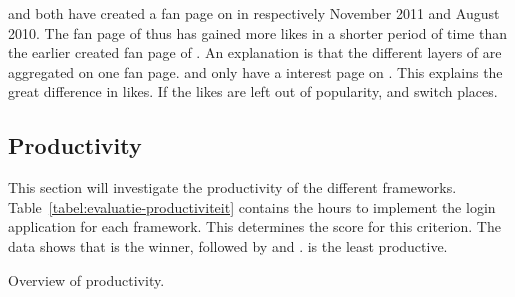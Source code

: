 \documentclass[a4paper]{artikel3}
\begin{document}
\kendoa{} and \jqma{} both have created a fan page on \fb{} in respectively November 2011 and August 2010.
The fan page of \kendoa{} thus has gained more \fb{} likes in a shorter period of time than the earlier created fan page of \jqma{}.
An explanation is that the different layers of \kendo{} are aggregated on one fan page.
\sta{} and \lungo{} only have a interest page on \fb.
This explains the great difference in \fb{} likes.
If the likes are left out of popularity, \kendoa{} and \jqma{} switch places.


\subsection{Productivity} %
\label{sec:evaluation-productivity}

This section will investigate the productivity of the different frameworks.
Table~\ref{tabel:evaluatie-productiviteit} contains the hours to implement the login application for each framework.
This determines the score for this criterion.
The data shows that \jqma{} is the winner,  followed by \lungo{} and \kendoa{}.
\sta{} is the least productive.

\begin{table}[t]
\centering
{}
\caption{Overview of productivity.}
\label{tabel:evaluatie-productiviteit}
\end{table}

\end{document}
